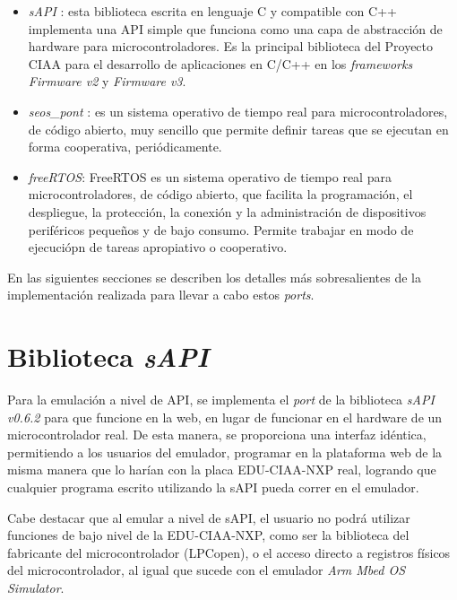 \begin{itemize}
    \item \textit{sAPI} \citep{sAPICIAA}: esta biblioteca escrita en lenguaje C y compatible con C++ implementa una API simple que funciona como una capa de abstracción de hardware para microcontroladores. Es la principal biblioteca del Proyecto CIAA para el desarrollo de aplicaciones en C/C++ en los \textit{frameworks Firmware v2} \citep{firmwareV2} y \textit{Firmware v3}. 
    \item \textit{seos\_pont} \citep{seospont}: es un sistema operativo de tiempo real para microcontroladores, de código abierto, muy sencillo que permite definir tareas que se ejecutan en forma cooperativa, periódicamente. 
    \item \textit{freeRTOS}: \citep{freeRTOS} FreeRTOS es un sistema operativo de tiempo real para microcontroladores, de código abierto, que facilita la programación, el despliegue, la protección, la conexión y la administración de dispositivos periféricos pequeños y de bajo consumo. Permite trabajar en modo de ejecuciópn de tareas apropiativo o cooperativo.
\end{itemize}

En las siguientes secciones se describen los detalles más sobresalientes de la implementación realizada para llevar a cabo estos \textit{ports}.

\section{Biblioteca \textit{sAPI}}
\label{sec:sAPI}

Para la emulación a nivel de API, se implementa el \textit{port} de la biblioteca \textit{sAPI v0.6.2} para que funcione en la web, en lugar de funcionar en el hardware de un microcontrolador real. De esta manera, se proporciona una interfaz idéntica, permitiendo a los usuarios del emulador, programar en la plataforma web de la misma manera que lo harían con la placa EDU-CIAA-NXP real, logrando que cualquier programa escrito utilizando la sAPI pueda correr en el emulador.

Cabe destacar que al emular a nivel de sAPI, el usuario no podrá utilizar funciones de bajo nivel de la EDU-CIAA-NXP, como ser la biblioteca del fabricante del microcontrolador (LPCopen\citep{lpcopen}), o el acceso directo a registros físicos del microcontrolador, al igual que sucede con el emulador \textit{Arm Mbed OS Simulator}.

